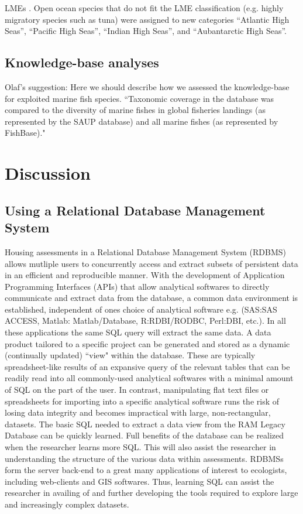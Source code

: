 \documentclass[letterpaper,12pt]{article}
\begin{document}
LMEs \citep{NOAA:LME64:1998}. Open ocean species that do not fit the
LME classification (e.g. highly migratory species such as tuna) were
assigned to new categories ``Atlantic High Seas'', ``Pacific High Seas'', ``Indian High Seas'', and ``Aubantarctic High Seas''.

\subsection{Knowledge-base analyses}
Olaf's suggestion: Here we should describe how we assessed the knowledge-base for exploited marine fish species. ``Taxonomic coverage in the database was compared to the diversity of marine fishes in global fisheries landings (as represented by the SAUP database) and all marine fishes (as represented by FishBase)."  



\newpage
\section{Discussion}
\subsection{Using a Relational Database Management System}
Housing assessments in a Relational Database Management System (RDBMS) allows mutliple users to concurrently access and extract subsets of persistent data in an efficient and reproducible manner. With the development of Application Programming Interfaces (APIs) that allow analytical softwares to directly communicate and extract data from the database, a common data environment is established, independent of ones choice of analytical software e.g. (SAS:SAS ACCESS, Matlab: Matlab/Database, R:RDBI/RODBC, Perl:DBI, etc.). In all these applications the same SQL query will extract the same data. A data product tailored to a specific project can be generated and stored as a dynamic (continually updated) ``view" within the database. These are typically spreadsheet-like results of an expansive query of the relevant tables that can be readily read into all commonly-used analytical softwares with a minimal amount of SQL on the part of the user. In contrast, manipulating flat text files or spreadsheets for importing into a specific analytical software runs the risk of losing data integrity and becomes impractical with large, non-rectangular, datasets. The basic SQL needed to extract a data view from the RAM Legacy Database can be quickly learned. Full benefits of the database can be realized when the researcher learns more SQL. This will also assist the researcher in understanding the structure of the various data within assessments. RDBMSs form the server back-end to a great many  applications of interest to ecologists, including web-clients and GIS softwares. Thus, learning SQL can assist the researcher in availing of and further developing the tools required to explore large and increasingly complex datasets. 
\end{document}
